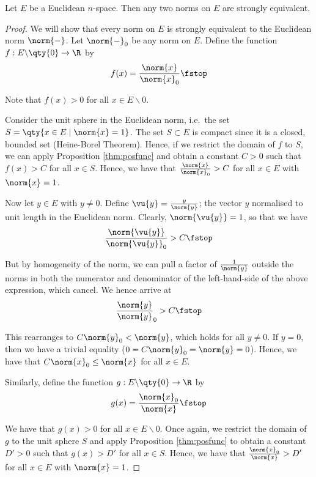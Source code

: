  \begin{theorem}
   \label{thm:norm-equiv}
   Let \( E \) be a Euclidean \( n \)-space. Then any two norms on \( E \) are strongly equivalent.
 \end{theorem}
 \begin{proof}
   We will show that every norm on \( E \) is strongly equivalent to the Euclidean norm \( \norm{-} \). Let \( \norm{-}_0 \) be any norm on \( E \). Define the function \( f:E\backslash\qty{0}\to\R \) by
   \[ f(x)=\frac{\norm{x}}{\norm{x}_0}\fstop \]

   Note that \( f(x)>0 \) for all \( x\in E\backslash\qty{0} \).

   \vspace{3mm}
   
   Consider the unit sphere in the Euclidean norm, i.e.\ the set \( S=\qty{x\in E\mid\norm{x}=1} \). The set \( S\subset E \) is compact since it is a closed, bounded set (Heine-Borel Theorem). Hence, if we restrict the domain of \( f \) to \( S \), we can apply Proposition \ref{thm:posfunc} and obtain a constant \( C>0 \) such that \( f(x)>C \) for all \( x\in S \). Hence, we have that \( \frac{\norm{x}}{\norm{x}_0}>C \) for all \( x\in E \) with \( \norm{x}=1 \).

   \vspace{3mm}

   Now let \( y\in E \) with \( y\neq 0 \). Define \( \vu{y}=\frac{y}{\norm{y}} \); the vector \( y \) normalised to unit length in the Euclidean norm. Clearly, \( \norm{\vu{y}}=1 \), so that we have
   \[ \frac{\norm{\vu{y}}}{\norm{\vu{y}}_0}>C\fstop \]
   
   But by homogeneity of the norm, we can pull a factor of \( \frac{1}{\norm{y}} \) outside the norms in both the numerator and denominator of the left-hand-side of the above expression, which cancel. We hence arrive at
   \[ \frac{\norm{y}}{\norm{y}}_0>C\fstop \]

   This rearranges to \( C\norm{y}_0<\norm{y} \), which holds for all \( y\neq 0 \). If \( y=0 \), then we have a trivial equality (\( 0=C\norm{y}_0=\norm{y}=0 \)). Hence, we have that \( C\norm{x}_0\leq\norm{x} \) for all \( x\in E \).

   \vspace{3mm}

   Similarly, define the function \( g:E\backslash\qty{0}\to\R \) by
   \[ g(x)=\frac{\norm{x}_0}{\norm{x}}\fstop \]

   We have that \( g(x)>0 \) for all \( x\in E\backslash\qty{0} \). Once again, we restrict the domain of \( g \) to the unit sphere \( S \) and apply Proposition \ref{thm:posfunc} to obtain a constant \( D'>0 \) such that \( g(x)>D' \) for all \( x\in S \). Hence, we have that \( \frac{\norm{x}_0}{\norm{x}}>D' \) for all \( x\in E \) with \( \norm{x}=1 \).


\end{proof}

